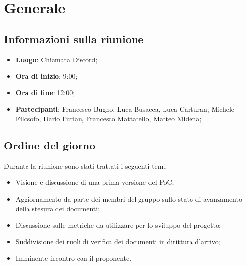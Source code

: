 \section{Generale}

\vspace{10pt}


\subsection{Informazioni sulla riunione}
\begin{itemize}
	\item \textbf{Luogo}: Chiamata Discord;
	\item \textbf{Ora di inizio}: 9:00;
	\item \textbf{Ora di fine}: 12:00;
	\item \textbf{Partecipanti}: Francesco Bugno, Luca Busacca, Luca Carturan, Michele Filosofo,
	Dario Furlan, Francesco Mattarello, Matteo Midena;
\end{itemize}

\vspace{5pt}

\subsection{Ordine del giorno}
Durante la riunione sono stati trattati i seguenti temi:
\begin{itemize}
	\item Visione e discussione di una prima versione del PoC\glo;
	\item Aggiornamento da parte dei membri del gruppo sullo stato di avanzamento della stesura dei documenti;
	\item Discussione sulle metriche da utilizzare per lo sviluppo del progetto;
	\item Suddivisione dei ruoli di verifica dei documenti in dirittura d'arrivo;
	\item Imminente incontro con il proponente.
\end{itemize}
